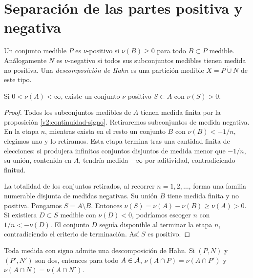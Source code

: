\section{Separación de las partes positiva y negativa}\label{lectura:v2-25}
\begin{definicion}
Un conjunto medible $P$ es $\nu$-positivo si $\nu(B)\ge0$ para todo $B\subset P$ medible. Análogamente $N$ es $\nu$-negativo si todos sus subconjuntos medibles tienen medida no positiva. Una \emph{descomposición de Hahn} es una partición medible $X=P\mathbin{\dot\cup}N$ de este tipo.
\end{definicion}
\begin{lema}\label{v2:subconjunto-positivo}
Si $0<\nu(A)<\infty$, existe un conjunto $\nu$-positivo $S\subset A$ con $\nu(S)>0$.
\end{lema}
\begin{proof}
Todos los subconjuntos medibles de $A$ tienen medida finita por la proposición \ref{v2:continuidad-signo}. Retiraremos subconjuntos de medida negativa. En la etapa $n$, mientras exista en el resto un conjunto $B$ con $\nu(B)<-1/n$, elegimos uno y lo retiramos. Esta etapa termina tras una cantidad finita de elecciones: si produjera infinitos conjuntos disjuntos de medida menor que $-1/n$, su unión, contenida en $A$, tendría medida $-\infty$ por aditividad, contradiciendo finitud.

La totalidad de los conjuntos retirados, al recorrer $n=1,2,\ldots$, forma una familia numerable disjunta de medidas negativas. Su unión $B$ tiene medida finita y no positiva. Pongamos $S=A\setminus B$. Entonces $\nu(S)=\nu(A)-\nu(B)\ge\nu(A)>0$. Si existiera $D\subset S$ medible con $\nu(D)<0$, podríamos escoger $n$ con $1/n<-\nu(D)$. El conjunto $D$ seguía disponible al terminar la etapa $n$, contradiciendo el criterio de terminación. Así $S$ es positivo.
\end{proof}
\begin{teorema}[Hahn]\label{v2:hahn}
Toda medida con signo admite una descomposición de Hahn. Si $(P,N)$ y $(P',N')$ son dos, entonces para todo $A\in\mathcal A$,
$\nu(A\cap P)=\nu(A\cap P')$ y $\nu(A\cap N)=\nu(A\cap N')$.
\end{teorema}
